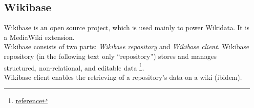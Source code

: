\documentclass[11pt]{article}
\begin{document}
\subsection{Wikibase}
Wikibase is an open source project, which is used mainly to power Wikidata. It is a MediaWiki extension. \\
Wikibase consists of two parts: \textit{Wikibase repository} and \textit{Wikibase client}. Wikibase repository (in the following text only ``repository'')  stores and manages structured, non-relational, and editable data \footnote{\href{http://wikiba.se/}{reference}}. \\
Wikibase client enables the retrieving of a repository's data on a wiki (ibidem). 
\end{document}
